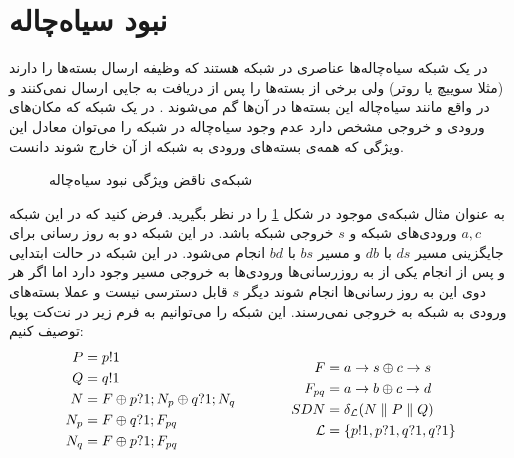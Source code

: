 \section{نبود سیاه‌چاله}
در یک شبکه سیاه‌چاله‌ها%
عناصری در شبکه هستند که وظیفه ارسال بسته‌ها را دارند
(مثلا سوییچ‌ یا روتر)
ولی برخی از بسته‌ها را پس از دریافت به جایی ارسال نمی‌کنند و در واقع مانند سیاه‌چاله این بسته‌ها در آن‌ها گم می‌شوند
\cite{network-abstractions}.
در یک شبکه که مکان‌های ورودی و خروجی مشخص دارد عدم وجود سیاه‌چاله در شبکه را می‌توان معادل این ويژگی که همه‌ی بسته‌های ورودی به شبکه از آن خارج شوند دانست.
\begin{figure}
    \centering
    \caption{ 
        شبکه‌ی ناقض ویژگی نبود سیاه‌چاله
    }
    \label{fig:blackhole}
\end{figure}
به عنوان مثال شبکه‌ی موجود در شکل
\ref{fig:blackhole}
را در نظر بگیرید.
فرض کنید که در این شبکه
$a,c$
ورودی‌های شبکه و
$s$
خروجی شبکه باشد.
در این شبکه دو به روز رسانی برای جایگزینی
مسیر
$ds$
با
$db$
و مسیر
$bs$
با
$bd$
انجام می‌شود.
در این شبکه در حالت ابتدایی و پس از انجام یکی از به روز‌رسانی‌ها ورودی‌ها به خروجی مسیر وجود دارد اما اگر هر دوی این به روز رسانی‌ها انجام شوند دیگر
$s$
قابل دسترسی نیست و عملا بسته‌های ورودی به شبکه به خروجی نمی‌رسند.
این شبکه را می‌توانیم به فرم زیر در نت‌کت پویا توصیف کنیم:
\begin{equation*}
    \begin{aligned}[c]
        P   & = p!1                             \\
        Q   & = q!1                             \\
        N   & = F \oplus p?1;N_p \oplus q?1;N_q \\
        N_p & = F \oplus q?1;F_{pq}             \\
        N_q & = F \oplus p?1;F_{pq}
    \end{aligned}
    \qquad\qquad
    \begin{aligned}[c]
        F           & = a\rightarrow s \oplus c\rightarrow s            \\
        F_{pq}      & = a\rightarrow b \oplus c\rightarrow d            \\
        SDN         & = \delta_{\mathcal{L}} (N
        \parallel P \parallel Q)                \\
        \mathcal{L} & = \{p!1,p?1,q?1,q?1\}
    \end{aligned}
\end{equation*}
